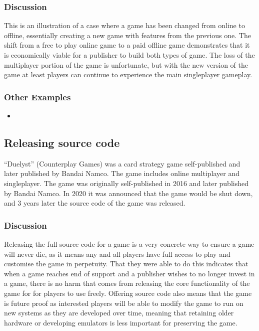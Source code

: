 \subsubsection*{Discussion}
This is an illustration of a case where a game has been changed from online to offline, essentially creating a new game with features from the previous one.
The shift from a free to play online game to a paid offline game demonstrates that it is economically viable for a publisher to build both types of game.
The loss of the multiplayer portion of the game is unfortunate, but with the new version of the game at least players can continue to experience the main singleplayer gameplay.

\subsubsection*{Other Examples}
\begin{itemize}
    \item
\end{itemize}

\subsection{Releasing source code}
``Duelyst'' (Counterplay Games) was a card strategy game self-published and later published by Bandai Namco.
The game includes online multiplayer and singleplayer.
The game was originally self-published in 2016 and later published by Bandai Namco.
In 2020 it was announced that the game would be shut down,
and 3 years later the \gls{source} code of the game was released\cite{duelyst-2023}.

\subsubsection*{Discussion}
Releasing the full source code for a game is a very concrete way to ensure a game will never die, as it means any and all players have full access to play and customise the game in perpetuity.
That they were able to do this indicates that when a game reaches end of support and a publisher wishes to no longer invest in a game,
there is no harm that comes from releasing the core functionality of the game for for players to use freely.
Offering source code also means that the game is future proof as interested players will be able to modify the game to run on new systems as they are developed over time,
meaning that retaining older hardware or developing emulators is less important for preserving the game.

